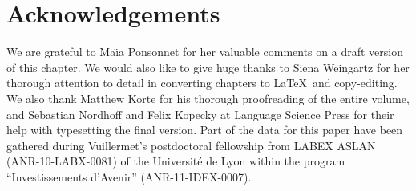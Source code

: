 \documentclass[output=paper,colorlinks,citecolor=brown]{langscibook}
\begin{document}
\section*{Acknowledgements}
We are grateful to Ma\"{\i}a Ponsonnet for her valuable comments on a draft version of this chapter. We would also like to give huge thanks to Siena Weingartz for her thorough attention to detail in converting chapters to \LaTeX\ and copy-editing. We also thank Matthew Korte for his thorough proofreading of the entire volume, and Sebastian Nordhoff and Felix Kopecky at Language Science Press for their help with typesetting the final version. Part of the data for this paper have been gathered during Vuillermet's postdoctoral fellowship from LABEX ASLAN (ANR-10-LABX-0081) of the Université de Lyon within the program ``Investissements d'Avenir'' (ANR-11-IDEX-0007).
\end{document}
